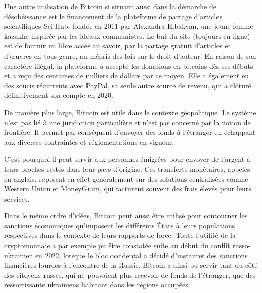 Une autre utilisation de Bitcoin si situant aussi dans la démarche de désobéissance est le financement de la plateforme de partage d'articles scientifiques Sci-Hub, fondée en 2011 par Alexandra Elbakyan, une jeune femme kazakhe inspirée par les idéaux communistes. Le but du site (toujours en ligne) est de fournir un libre accès au savoir, par la partage gratuit d'articles et d'œuvres en tous genre, au mépris des lois sur le droit d'auteur. En raison de son caractère illégal, la plateforme a accepté les donations en bitcoins dès ses débuts et a reçu des centaines de milliers de dollars par ce moyen. Elle a également eu des soucis récurrents avec PayPal, sa seule autre source de revenu, qui a clôturé définitivement son compte en 2020.


De manière plus large, Bitcoin est utile dans le contexte géopolitique. Le système n'est pas lié à une juridiction particulière et n'est pas concerné par la notion de frontière. Il permet par conséquent d'envoyer des fonds à l'étranger en échappant aux diverses contraintes et réglementations en vigueur.

C'est pourquoi il peut servir aux personnes émigrées pour envoyer de l'argent à leurs proches restés dans leur pays d'origine. Ces transferts monétaires, appelés  en anglais, reposent en effet généralement sur des solutions centralisées comme Western Union et MoneyGram, qui facturent souvent des frais élevés pour leurs services. %

Dans le même ordre d'idées, Bitcoin peut aussi être utilisé pour contourner les sanctions économiques qu'imposent les différents États à leurs populations respectives dans le contexte de leurs rapports de force. Toute l'utilité de la cryptomonnaie a par exemple pu être constatée suite au début du conflit russo-ukrainien en 2022, lorsque le bloc occidental a décidé d'instaurer des sanctions financières lourdes à l'encontre de la Russie. Bitcoin a ainsi pu servir tant du côté des citoyens russes, qui ne pouvaient plus recevoir de fonds de l'étranger, que des ressortissants ukrainiens habitant dans les régions occupées.

